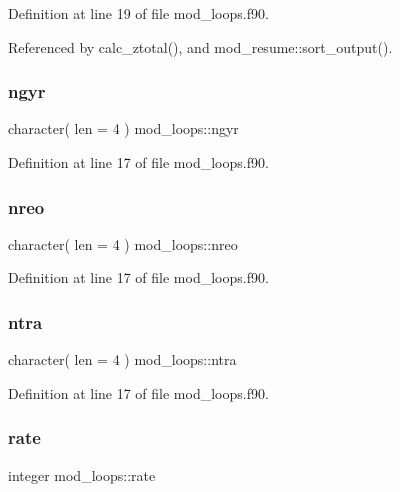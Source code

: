 Definition at line 19 of file mod\+\_\+loops.\+f90.



Referenced by calc\+\_\+ztotal(), and mod\+\_\+resume\+::sort\+\_\+output().

\mbox{\label{namespacemod__loops_aa5002187d8846b45d30e6d3845cf1301}} 
\subsubsection{\texorpdfstring{ngyr}{ngyr}}
{\footnotesize\ttfamily character( len = 4 ) mod\+\_\+loops\+::ngyr}



Definition at line 17 of file mod\+\_\+loops.\+f90.

\mbox{\label{namespacemod__loops_a2ee60c7992c0befa3757b0996e34c356}} 
\subsubsection{\texorpdfstring{nreo}{nreo}}
{\footnotesize\ttfamily character( len = 4 ) mod\+\_\+loops\+::nreo}



Definition at line 17 of file mod\+\_\+loops.\+f90.

\mbox{\label{namespacemod__loops_a79e040eb372f8de350337242a159e2b7}} 
\subsubsection{\texorpdfstring{ntra}{ntra}}
{\footnotesize\ttfamily character( len = 4 ) mod\+\_\+loops\+::ntra}



Definition at line 17 of file mod\+\_\+loops.\+f90.

\mbox{\label{namespacemod__loops_ab4cd7025ac3ba99baaa6d706f7c7cdb7}} 
\subsubsection{\texorpdfstring{rate}{rate}}
{\footnotesize\ttfamily integer mod\+\_\+loops\+::rate}



